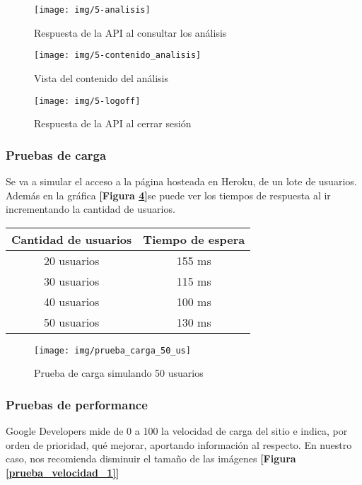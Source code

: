    \begin{figure}[h]
        \centering
        \texttt{[image: img/5-analisis]}
        \caption{Respuesta de la API al consultar los análisis}
		\label{5-analisis}
    \end{figure}
    
    \begin{figure}[h]
        \centering
        \texttt{[image: img/5-contenido\_analisis]}
        \caption{Vista del contenido del análisis}
		\label{5-contenido_analisis}
    \end{figure}
    
    \begin{figure}[h]
        \centering
        \texttt{[image: img/5-logoff]}
        \caption{Respuesta de la API al cerrar sesión}
		\label{5-logoff}
    \end{figure}
    



\clearpage



\subsubsection{Pruebas de carga}
Se va a simular el acceso a la página hosteada en Heroku, de un lote de usuarios. Además en la gráfica \textbf{[Figura \ref{prueba_carga_50_us}]}se puede ver los tiempos de respuesta al ir incrementando la cantidad de usuarios.

\begin{center}
\begin{tabular}{|c|c|}
	\hline \textbf{Cantidad de usuarios}  &  \textbf{Tiempo de espera}\\ 
	\hline 20 usuarios &  155 ms \\ 
	\hline 30 usuarios  & 115 ms \\ 
	\hline 40 usuarios  & 100 ms \\ 
	\hline 50 usuarios  & 130 ms \\ 	
	\hline 
\end{tabular} 
\end{center}

    \begin{figure}[h]
    	\centering
    	\texttt{[image: img/prueba\_carga\_50\_us]}
    	\caption{Prueba de carga simulando 50 usuarios}
    	\label{prueba_carga_50_us}
    \end{figure}


\subsubsection{Pruebas de performance}
Google Developers mide de 0 a 100 la velocidad de carga del sitio e indica, por orden de prioridad, qué mejorar, aportando información al respecto.
En nuestro caso, nos recomienda disminuir el tamaño de las imágenes \textbf{[Figura \ref{prueba_velocidad_1}]}

